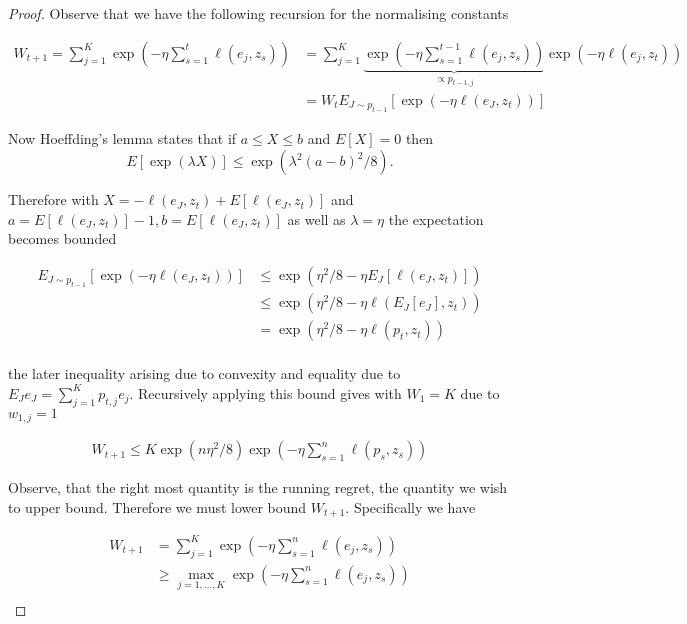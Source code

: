 \begin{proof}

Observe that we have the following recursion for the normalising constants 

\begin{align*}
	W_{t+1} = 
	\sum_{j=1}^K \exp
	\left(
	-\eta \sum_{s=1}^{t}\ell(e_j,z_s)
	\right) & = 
	\sum_{j=1}^K 	\underbrace{ \exp
	\left(
	-\eta \sum_{s=1}^{t-1}\ell(e_j,z_s)
	\right)	
	}_{
	\propto p_{t-1,j}
	}
	\exp\left(-\eta \ell(e_j,z_t)\right)\\
	& = W_{t}E_{J \sim p_{t-1}}\left[
		\exp\left(-\eta \ell(e_J,z_t)\right)
	\right]
\end{align*}

Now Hoeffding’s lemma states that if $a \leq X \leq b$  and $E[X] = 0$ then 
$$
	E[\exp(\lambda X )] \leq \exp(\lambda^2 ( a - b)^2 /8).
$$ 

Therefore with $X = - \ell(e_J,z_t) + E[\ell(e_J,z_t)]$ and $a = E[\ell(e_J,z_t)] - 1, b =  E[\ell(e_J,z_t)]$ as well as $\lambda = \eta$ the expectation becomes bounded

\begin{align*}
	E_{J \sim p_{t-1}}\left[\exp\left(-\eta \ell(e_J,z_t)\right)\right] 
	&\leq \exp\left( \eta^2/8 - \eta E_{J}[\ell(e_J,z_t)]\right) \\
	&\leq \exp\left( \eta^2/8 - \eta \ell(E_{J}[e_J],z_t)\right) \\
	& = \exp\left( \eta^2/8 - \eta \ell(p_t,z_t)\right) \\
\end{align*}

the later inequality arising due to convexity and equality due to $E_Je_J = \sum_{j=1}^K p_{t,j}e_j$. Recursively applying this bound gives with $W_1 = K$ due to $w_{1,j} = 1$ 

\begin{align*}
W_{t+1} \leq K \exp(n \eta^2/8) \exp\left( - \eta \sum_{s=1}^{n} \ell(p_s,z_s)\right)
\end{align*}

Observe, that the right most quantity is the running regret, the quantity we wish to upper bound. Therefore we must lower bound $W_{t+1}$. Specifically we have 

\begin{align*}
	W_{t+1} & = \sum_{j=1}^K \exp\left( - \eta \sum_{s=1}^n\ell(e_j,z_s)\right) \\
	& \geq  \max_{j =1,\dots,K} \exp\left( - \eta \sum_{s=1}^n\ell(e_j,z_s)\right)\\
\end{align*}


\end{proof}
